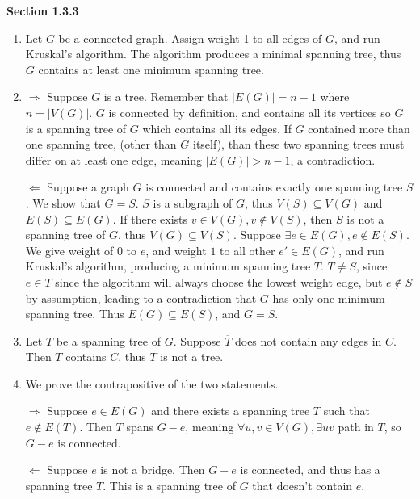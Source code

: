 \documentclass[11pt]{article}
\begin{document}
{\bfseries Section 1.3.3}

\begin{enumerate}[1]
    \item %
        Let $G$ be a connected graph. Assign weight 1 to all edges of $G$, and 
        run Kruskal's algorithm. The algorithm produces a minimal spanning tree,
        thus $G$ contains at least one minimum spanning tree.
    \item %
        $\Rightarrow$ Suppose $G$ is a tree. Remember that $|E(G)| = n - 1$ 
        where $n = |V(G)|$. $G$ is connected by definition,
        and contains all its vertices so $G$ is a spanning tree of $G$ which 
        contains all its edges. If $G$ contained more than one spanning tree, 
        (other than $G$ itself), than these two spanning trees must differ 
        on at least one edge, meaning $|E(G)| > n - 1$, a contradiction. 
        
        $\Leftarrow$ Suppose a graph $G$ is connected and contains exactly one 
        spanning tree $S$. We show that $G = S$. $S$ is a subgraph of $G$, thus
        $V(S) \subseteq V(G)$ and $E(S) \subseteq E(G)$. If there exists 
        $v \in V(G), v \notin V(S)$, then $S$ is not a spanning tree of 
        $G$, thus $V(G) \subseteq V(S)$. Suppose $\exists e \in E(G), e \notin 
        E(S)$. We give weight of $0$ to $e$, and weight $1$ to all other $e' \in
        E(G)$, and run Kruskal's algorithm, producing a minimum spanning tree
        $T$. $T \neq S$, since $e \in T$ since the algorithm will always choose 
        the lowest weight edge, but $e \notin S$ by assumption, leading to 
        a contradiction that $G$ has only one minimum spanning tree. Thus
        $E(G) \subseteq E(S)$, and $G = S$. 

    \item %
        Let $T$ be a spanning tree of $G$. Suppose $\overline{T}$ does not contain
        any edges in $C$. Then $T$ contains $C$, thus $T$ is not a tree. 

    \item %
        We prove the contrapositive of the two statements.

        $\Rightarrow$ Suppose $e \in E(G)$ and 
        there exists a spanning tree $T$ such that $e \notin E(T)$. Then 
        $T$ spans $G - e$, meaning $\forall u,v \in V(G), \exists uv$ path in 
        $T$, so $G - e$ is connected.

        $\Leftarrow$ Suppose $e$ is not a bridge. Then $G - e$ is connected,
        and thus has a spanning tree $T$. This is a spanning tree of $G$ that 
        doesn't contain $e$. 
\end{enumerate}
\end{document}
